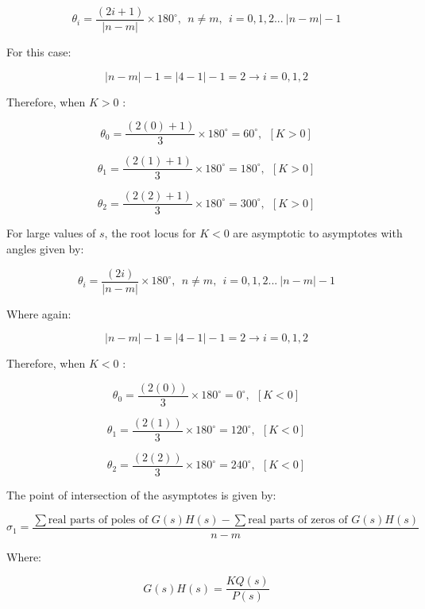 \documentclass[12pt, letterpaper]{../assignment}
\begin{document}
$$ \theta_i = \frac{(2i+1)}{|n-m|} \times 180^{\circ}, \ \ n \neq m, \ \ i = 0,1,2... \ |n-m|-1$$

For this case:

$$ |n-m|-1 = |4-1|-1 = 2 \rightarrow i = 0,1,2 $$

Therefore, when $K > 0$ :

\begin{answer}
    $$ \theta_0 = \frac{(2(0)+1)}{3} \times 180^{\circ} = 60^{\circ}, \ \ [K > 0] $$
\end{answer}

\begin{answer}
    $$ \theta_1 = \frac{(2(1)+1)}{3} \times 180^{\circ} = 180^{\circ}, \ \ [K > 0] $$
\end{answer}

\begin{answer}
    $$ \theta_2 = \frac{(2(2)+1)}{3} \times 180^{\circ} = 300^{\circ}, \ \ [K > 0] $$
\end{answer}

For large values of $s$, the root locus for $K < 0$ are asymptotic to asymptotes with angles
given by:

$$ \theta_i = \frac{(2i)}{|n-m|} \times 180^{\circ}, \ \ n \neq m, \ \ i = 0,1,2... \ |n-m|-1$$

Where again:

$$ |n-m|-1 = |4-1|-1 = 2 \rightarrow i = 0,1,2 $$

Therefore, when $K < 0$ :

\begin{answer}
    $$ \theta_0 = \frac{(2(0))}{3} \times 180^{\circ} = 0^{\circ}, \ \ [K < 0] $$
\end{answer}

\begin{answer}
    $$ \theta_1 = \frac{(2(1))}{3} \times 180^{\circ} = 120^{\circ}, \ \ [K < 0] $$
\end{answer}

\begin{answer}
    $$ \theta_2 = \frac{(2(2))}{3} \times 180^{\circ} = 240^{\circ}, \ \ [K < 0] $$
\end{answer}

The point of intersection of the asymptotes is given by:

$$ \sigma_1 = \frac{\sum \text{real parts of poles of } G(s)H(s) - \sum \text{real parts of zeros of } G(s)H(s) }{n-m} $$

Where:

$$ G(s)H(s) = \frac{K Q(s)}{P(s)} $$
\end{document}
